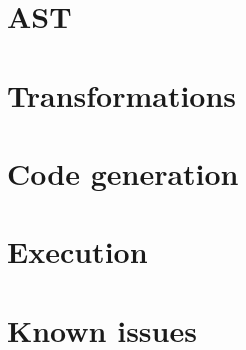 \documentclass[a4paper,11pt]{article}
\begin{document}
\section{AST}

\section{Transformations}

\section{Code generation}

\section{Execution}

\section{Known issues}
\end{document}
